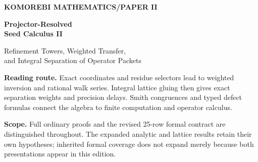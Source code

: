 \documentclass[11pt,a4paper]{article}
\theoremstyle{definition}
\theoremstyle{remark}
\providecommand{\Seed}{\mathfrak S}
\theoremstyle{definition}\newtheorem{construction}[theorem]{Construction}\newtheorem{certificate}[theorem]{Numerical Certificate}
\theoremstyle{remark}\newtheorem{boundary}[theorem]{Boundary}
\begin{document}
\begin{titlepage}\thispagestyle{empty}
\vspace*{13mm}
{\sffamily\bfseries\color{accent}\large KOMOREBI MATHEMATICS\quad /\quad PAPER II\par}
\vspace{12mm}
{\sffamily\bfseries\fontsize{29}{34}\selectfont Projector-Resolved\\Seed Calculus II\par}
\vspace{8mm}
{\sffamily\fontsize{18}{23}\selectfont Refinement Towers, Weighted Transfer,\\and Integral Separation of Operator Packets\par}
\vspace{12mm}{\large Komorebi P.\par}
\vfill
\noindent\begin{minipage}{.94\linewidth}
\textbf{Reading route.} Exact coordinates and residue selectors lead to weighted inversion and rational walk series.  Integral lattice gluing then gives exact separation weights and precision delays.  Smith congruences and typed defect formulas connect the algebra to finite computation and operator calculus.

\medskip
\textbf{Scope.} Full ordinary proofs and the revised 25-row formal contract are distinguished throughout.  The expanded analytic and lattice results retain their own hypotheses; inherited formal coverage does not expand merely because both presentations appear in this edition.
\end{minipage}
\vspace{13mm}
\end{titlepage}
\begin{abstract}

A complete family of idempotents gives exact coordinates, but a single family does not record scale or integral visibility.  We study towers in which every coarse idempotent is the sum of its fine descendants.  The coordinate changes are invertible and coherent, and every operator block is the sum of its refined blocks.  Residue selectors give a model over arbitrary rings.  When roots of unity are available they agree with character averages, and coprime moduli factor through the Chinese remainder theorem.  In a complete filtered algebra, a diagonal operator plus positive weight transfers has an inverse obtained by summing admissible weighted paths.  The formula truncates exactly at finite precision, while finite transfer graphs have rational path series.  For a rational spectral decomposition over a discrete valuation ring, resultants give denominator bounds.  The exact denominator is the largest Smith exponent of the lattice gluing module.  This yields a necessary and sufficient precision delay, monotonicity under refinement, and a full congruence solving formula.  We close with exact formulas for the propagation of a coarse graining defect through powers, resolvents, holomorphic functions, exponentials, and multilevel towers.
\end{abstract}
\end{document}
